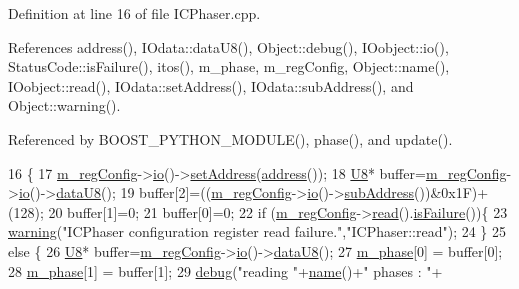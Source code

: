 Definition at line 16 of file I\+C\+Phaser.\+cpp.



References address(), I\+Odata\+::data\+U8(), Object\+::debug(), I\+Oobject\+::io(), Status\+Code\+::is\+Failure(), itos(), m\+\_\+phase, m\+\_\+reg\+Config, Object\+::name(), I\+Oobject\+::read(), I\+Odata\+::set\+Address(), I\+Odata\+::sub\+Address(), and Object\+::warning().



Referenced by B\+O\+O\+S\+T\+\_\+\+P\+Y\+T\+H\+O\+N\+\_\+\+M\+O\+D\+U\+L\+E(), phase(), and update().


\begin{DoxyCode}
16                     \{
17   \hyperlink{classICPhaser_af135fe05b7c087639789afe470e88ce4}{m\_regConfig}->\hyperlink{classIOobject_af04fb94137c3d86849f478ac5afab5d1}{io}()->\hyperlink{classIOdata_af98cbfbc28346ebb9b64ca0203af1463}{setAddress}(\hyperlink{classICPhaser_ac5cd0f3cb56324782ae8d360944a94fd}{address}());
18   \hyperlink{ICECALv3_8h_a3cb25ca6f51f003950f9625ff05536fc}{U8}* buffer=\hyperlink{classICPhaser_af135fe05b7c087639789afe470e88ce4}{m\_regConfig}->\hyperlink{classIOobject_af04fb94137c3d86849f478ac5afab5d1}{io}()->\hyperlink{classIOdata_a75e9c318dbac3a39402179070943d4bc}{dataU8}();
19   buffer[2]=((\hyperlink{classICPhaser_af135fe05b7c087639789afe470e88ce4}{m\_regConfig}->\hyperlink{classIOobject_af04fb94137c3d86849f478ac5afab5d1}{io}()->\hyperlink{classIOdata_a25df48b84364a468373260f823ed9c5f}{subAddress}())&0x1F)+(128);
20   buffer[1]=0;
21   buffer[0]=0;
22   \textcolor{keywordflow}{if} (\hyperlink{classICPhaser_af135fe05b7c087639789afe470e88ce4}{m\_regConfig}->\hyperlink{classIOobject_aa07610c11963b1db6710e3c76ceea456}{read}().\hyperlink{classStatusCode_a5dd22dc6eb2c52fc4cabc58f6dea2eb7}{isFailure}())\{
23     \hyperlink{classObject_a65cd4fda577711660821fd2cd5a3b4c9}{warning}(\textcolor{stringliteral}{"ICPhaser configuration register read failure."},\textcolor{stringliteral}{"ICPhaser::read"});
24   \}
25   \textcolor{keywordflow}{else} \{
26     \hyperlink{ICECALv3_8h_a3cb25ca6f51f003950f9625ff05536fc}{U8}* buffer=\hyperlink{classICPhaser_af135fe05b7c087639789afe470e88ce4}{m\_regConfig}->\hyperlink{classIOobject_af04fb94137c3d86849f478ac5afab5d1}{io}()->\hyperlink{classIOdata_a75e9c318dbac3a39402179070943d4bc}{dataU8}();
27     \hyperlink{classICPhaser_afe2a4527d58d08342d631dfa7c731203}{m\_phase}[0] = buffer[0];
28     \hyperlink{classICPhaser_afe2a4527d58d08342d631dfa7c731203}{m\_phase}[1] = buffer[1];
29     \hyperlink{classObject_aac010553f022165573714b7014a15f0d}{debug}(\textcolor{stringliteral}{"reading "}+\hyperlink{classObject_a300f4c05dd468c7bb8b3c968868443c1}{name}()+\textcolor{stringliteral}{" phases : "}+

\end{DoxyCode}
